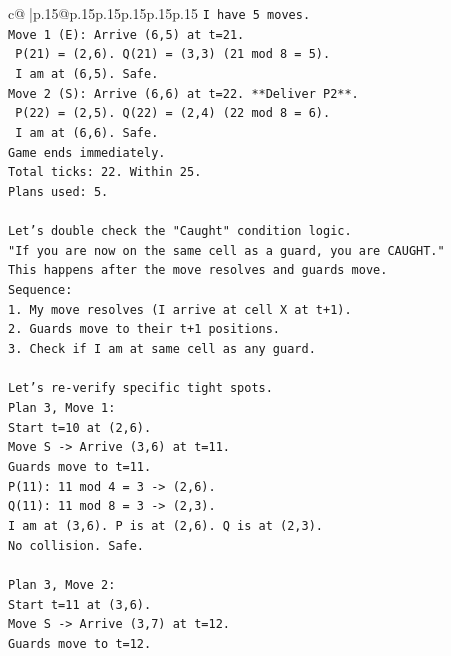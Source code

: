 \documentclass{article}
\begin{document}
{\begin{supertabular}{c@{$\;$}|p{.15\linewidth}@{}p{.15\linewidth}p{.15\linewidth}p{.15\linewidth}p{.15\linewidth}p{.15\linewidth}}
{{{\texttt{I have 5 moves.} \\
\texttt{Move 1 (E): Arrive (6,5) at t=21.} \\
\texttt{  P(21) = (2,6). Q(21) = (3,3) (21 mod 8 = 5).} \\
\texttt{  I am at (6,5). Safe.} \\
\texttt{Move 2 (S): Arrive (6,6) at t=22. **Deliver P2**.} \\
\texttt{  P(22) = (2,5). Q(22) = (2,4) (22 mod 8 = 6).} \\
\texttt{  I am at (6,6). Safe.} \\
\texttt{Game ends immediately.} \\
\texttt{Total ticks: 22. Within 25.} \\
\texttt{Plans used: 5.} \\
\\ 
\texttt{Let's double check the "Caught" condition logic.} \\
\texttt{"If you are now on the same cell as a guard, you are CAUGHT."} \\
\texttt{This happens after the move resolves and guards move.} \\
\texttt{Sequence:} \\
\texttt{1. My move resolves (I arrive at cell X at t+1).} \\
\texttt{2. Guards move to their t+1 positions.} \\
\texttt{3. Check if I am at same cell as any guard.} \\
\\ 
\texttt{Let's re{-}verify specific tight spots.} \\
\texttt{Plan 3, Move 1:} \\
\texttt{Start t=10 at (2,6).} \\
\texttt{Move S {-}> Arrive (3,6) at t=11.} \\
\texttt{Guards move to t=11.} \\
\texttt{P(11): 11 mod 4 = 3 {-}> (2,6).} \\
\texttt{Q(11): 11 mod 8 = 3 {-}> (2,3).} \\
\texttt{I am at (3,6). P is at (2,6). Q is at (2,3).} \\
\texttt{No collision. Safe.} \\
\\ 
\texttt{Plan 3, Move 2:} \\
\texttt{Start t=11 at (3,6).} \\
\texttt{Move S {-}> Arrive (3,7) at t=12.} \\
\texttt{Guards move to t=12.} \\
}}}
\end{supertabular}}
\end{document}
